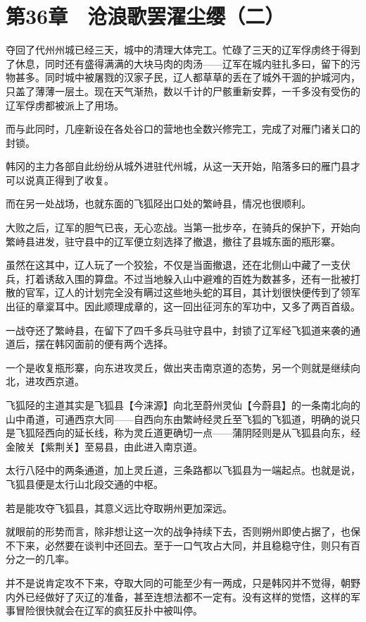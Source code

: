 \section{第36章　沧浪歌罢濯尘缨（二）}

夺回了代州州城已经三天，城中的清理大体完工。忙碌了三天的辽军俘虏终于得到了休息，同时还有盛得满满的大块马肉的肉汤——辽军在城内驻扎多曰，留下的污物甚多。同时城中被屠戮的汉家子民，辽人都草草的丢在了城外干涸的护城河内，只盖了薄薄一层土。现在天气渐热，数以千计的尸骸重新安葬，一千多没有受伤的辽军俘虏都被派上了用场。

而与此同时，几座新设在各处谷口的营地也全数兴修完工，完成了对雁门诸关口的封锁。

韩冈的主力各部自此纷纷从城外进驻代州城，从这一天开始，陷落多曰的雁门县才可以说真正得到了收复。

而在另一处战场，也就东面的飞狐陉出口处的繁峙县，情况也很顺利。

大败之后，辽军的胆气已丧，无心恋战。当第一批步卒，在骑兵的保护下，开始向繁峙县进发，驻守县中的辽军便立刻选择了撤退，撤往了县城东面的瓶形寨。

虽然在这其中，辽人玩了一个狡狯，不仅是当面撤退，还在北侧山中藏了一支伏兵，打着诱敌入围的算盘。不过当地躲入山中避难的百姓为数甚多，还有一批被打散的官军，辽人的计划完全没有瞒过这些地头蛇的耳目，其计划很快便传到了领军出征的章楶耳中。因此顺理成章的，这一回出征河东的军功中，又多了两百首级。

一战夺还了繁峙县，在留下了四千多兵马驻守县中，封锁了辽军经飞狐道来袭的通道后，摆在韩冈面前的便有两个选择。

一个是收复瓶形寨，向东进攻灵丘，做出夹击南京道的态势，另一个则就是继续向北，进攻西京道。

飞狐陉的主道其实是飞狐县【今涞源】向北至蔚州灵仙【今蔚县】的一条南北向的山中甬道，可通西京大同——自西向东由繁峙经灵丘至飞狐的飞狐道，明确的说只是飞狐陉西向的延长线，称为灵丘道更确切一点——蒲阴陉则是从飞狐县向东，经金陂关【紫荆关】至易县，由此进入南京道。

太行八陉中的两条通道，加上灵丘道，三条路都以飞狐县为一端起点。也就是说，飞狐县便是太行山北段交通的中枢。

若是能攻夺飞狐县，其意义远比夺取朔州更加深远。

就眼前的形势而言，除非想让这一次的战争持续下去，否则朔州即使占据了，也保不下来，必然要在谈判中还回去。至于一口气攻占大同，并且稳稳守住，则只有百分之一的几率。

并不是说肯定攻不下来，夺取大同的可能至少有一两成，只是韩冈并不觉得，朝野内外已经做好了灭辽的准备，甚至连想法都不一定有。没有这样的觉悟，这样的军事冒险很快就会在辽军的疯狂反扑中被叫停。

